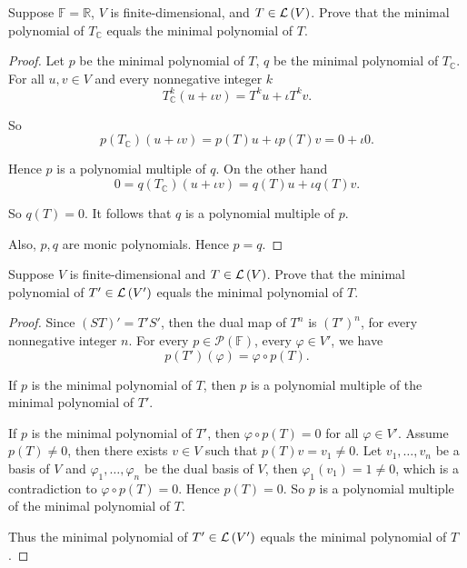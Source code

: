 \begin{exercise}
    Suppose $\mathbb{F} = \mathbb{R}$, $V$ is finite-dimensional, and $T\in\mathcal{L}\left({V}\right)$. Prove that the minimal polynomial of $T_{\mathbb{C}}$ equals the minimal polynomial of $T$.
\end{exercise}

\begin{proof}
    Let $p$ be the minimal polynomial of $T$, $q$ be the minimal polynomial of $T_{\mathbb{C}}$. For all $u, v\in V$ and every nonnegative integer $k$
    \[
        T_{\mathbb{C}}^{k}(u + \iota v) = T^{k}u + \iota T^{k}v.
    \]

    So
    \[
        p(T_{\mathbb{C}})(u + \iota v) = p(T)u + \iota p(T)v = 0 + \iota 0.
    \]

    Hence $p$ is a polynomial multiple of $q$. On the other hand
    \[
        0 = q(T_{\mathbb{C}})(u + \iota v) = q(T)u + \iota q(T)v.
    \]

    So $q(T) = 0$. It follows that $q$ is a polynomial multiple of $p$.

    Also, $p, q$ are monic polynomials. Hence $p = q$.
\end{proof}
\newpage

\begin{exercise}
    Suppose $V$ is finite-dimensional and $T \in \mathcal{L}\left({V}\right)$. Prove that the minimal polynomial of $T' \in \mathcal{L}\left({V'}\right)$ equals the minimal polynomial of $T$.
\end{exercise}

\begin{proof}
    Since $(ST)' = T'S'$, then the dual map of $T^{n}$ is ${(T')}^{n}$, for every nonnegative integer $n$. For every $p\in\mathscr{P}(\mathbb{F})$, every $\varphi\in V'$, we have
    \[
        p(T')(\varphi) = \varphi\circ p(T).
    \]

    If $p$ is the minimal polynomial of $T$, then $p$ is a polynomial multiple of the minimal polynomial of $T'$.

    If $p$ is the minimal polynomial of $T'$, then $\varphi\circ p(T) = 0$ for all $\varphi\in V'$. Assume $p(T)\ne 0$, then there exists $v\in V$ such that $p(T)v = v_{1}\ne 0$. Let $v_{1}, \ldots, v_{n}$ be a basis of $V$ and $\varphi_{1}, \ldots, \varphi_{n}$ be the dual basis of $V$, then $\varphi_{1}(v_{1}) = 1\ne 0$, which is a contradiction to $\varphi\circ p(T) = 0$. Hence $p(T) = 0$. So $p$ is a polynomial multiple of the minimal polynomial of $T$.

    Thus the minimal polynomial of $T' \in \mathcal{L}\left({V'}\right)$ equals the minimal polynomial of $T$.
\end{proof}
\newpage

